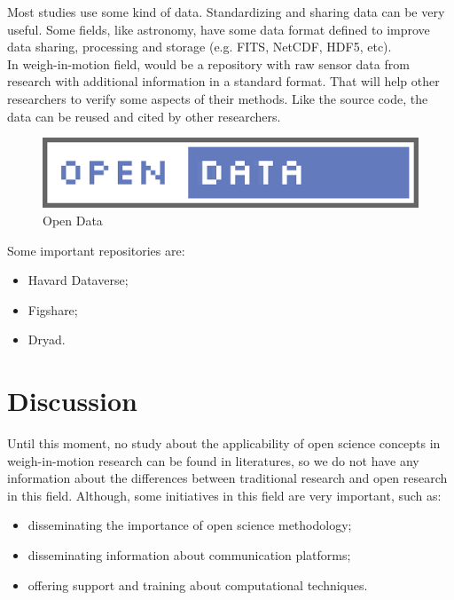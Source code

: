 \documentclass[a0,portrait]{a0poster}
\begin{document}
\begin{multicols}{2}
Most studies use some kind of data. Standardizing and sharing data can be very useful. Some fields, like astronomy, have some data format defined to improve data sharing, processing and storage  (e.g. FITS, NetCDF, HDF5, etc). \\

In weigh-in-motion field, would be a repository with raw sensor data from research with additional information in a standard format. That will help other researchers to verify some aspects of their methods. Like the source code, the data can be reused and cited by other researchers.\\

\begin{figure}
  \begin{center}
    \includegraphics[width=500px]{opendata.png}
  \end{center} 
  \caption{Open Data}
\end{figure}

Some important repositories are: 

\begin{itemize}
\item Havard Dataverse;
\item Figshare;
\item Dryad.
\end{itemize}


\section*{Discussion}

Until this moment, no study about the applicability of open science concepts in weigh-in-motion research can be found in literatures, so we do not have any information about the differences between traditional research and open research in this field. Although, some initiatives in this field are very important, such as:\\


\begin{itemize}
\item disseminating the importance of open science methodology;
\item disseminating information about communication platforms;
\item offering support and training about computational techniques.
\end{itemize}


\end{multicols}
\end{document}
